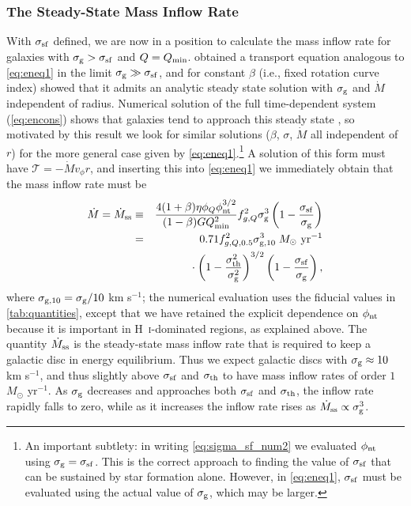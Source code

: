 \documentclass[useAMS,usenatbib]{mn2e}
\newcommand{\calT}{\mathcal{T}}
\newcommand{\phint}{\phi_{\mathrm{nt}}}
\newcommand{\Qmin}{Q_{\rm min}}
\begin{document}
\subsubsection{The Steady-State Mass Inflow Rate}
\label{sssec:mdot_ss}

With $\sigma_{\rm sf}$ defined, we are now in a position to calculate the mass inflow rate for galaxies with $\sigma_{\rm g} > \sigma_{\rm sf}$ and $Q = \Qmin$. \citet{krumholz10c} obtained a transport equation analogous to \autoref{eq:eneq1} in the limit $\sigma_{\rm g} \gg \sigma_{\rm sf}$, and for constant $\beta$ (i.e., fixed rotation curve index) showed that it admits an analytic steady state solution with $\sigma_{\rm g}$ and $\dot{M}$ independent of radius. Numerical solution of the full time-dependent system (\autoref{eq:encons}) shows that galaxies tend to approach this steady state \citep{forbes12a, forbes14a}, so motivated by this result we look for similar solutions ($\beta$, $\sigma$, $\dot{M}$ all independent of $r$) for the more general case given by \autoref{eq:eneq1}.\footnote{An important subtlety: in writing \autoref{eq:sigma_sf_num2} we evaluated $\phi_{\rm nt}$ using $\sigma_{\rm g} = \sigma_{\rm sf}$. This is the correct approach to finding the value of $\sigma_{\rm sf}$ that can be sustained by star formation alone. However, in \autoref{eq:eneq1}, $\sigma_{\rm sf}$ must be evaluated using the actual value of $\sigma_{\rm g}$, which may be larger.} A solution of this form must have $\calT = -\dot{M} v_\phi r$, and inserting this into \autoref{eq:eneq1} we immediately obtain that the mass inflow rate must be
\begin{eqnarray}
\label{eq:mdot_steady}
\dot{M} = \dot{M}_{\rm ss} & \equiv & \frac{4 (1+\beta) \eta \phi_Q \phint^{3/2}}{(1-\beta) G \Qmin^2} f_{g,Q}^2 \sigma_{\rm g}^3 \left(1 - \frac{\sigma_{\rm sf}}{\sigma_{\rm g}}\right) \\
& = & 0.71 f_{g,Q,0.5}^2 \sigma_{\rm g,10}^3\;M_\odot\mbox{ yr}^{-1}
\nonumber \\
& & {} \cdot
 \left(1 - \frac{\sigma_{\rm th}^2}{\sigma_{\rm g}^2}\right)^{3/2} \left(1 - \frac{\sigma_{\rm sf}}{\sigma_{\rm g}}\right),
\end{eqnarray}
where $\sigma_{\rm g,10} = \sigma_{\rm g}/10$ km s$^{-1}$; the numerical evaluation uses the fiducial values in \autoref{tab:quantities}, except that we have retained the explicit dependence on $\phi_{\rm nt}$ because it is important in H~\textsc{i}-dominated regions, as explained above. The quantity $\dot{M}_{\rm ss}$ is the steady-state mass inflow rate that is required to keep a galactic disc in energy equilibrium. Thus we expect galactic discs with $\sigma_{\rm g} \approx 10$ km s$^{-1}$, and thus slightly above $\sigma_{\rm sf}$ and $\sigma_{\rm th}$ to have mass inflow rates of order $1$ $M_\odot$ yr$^{-1}$. As $\sigma_{\rm g}$ decreases and approaches both $\sigma_{\rm sf}$ and $\sigma_{\rm th}$, the inflow rate rapidly falls to zero, while as it increases the inflow rate rises as $\dot{M}_{\rm ss} \propto \sigma_{\rm g}^3$.
\end{document}
